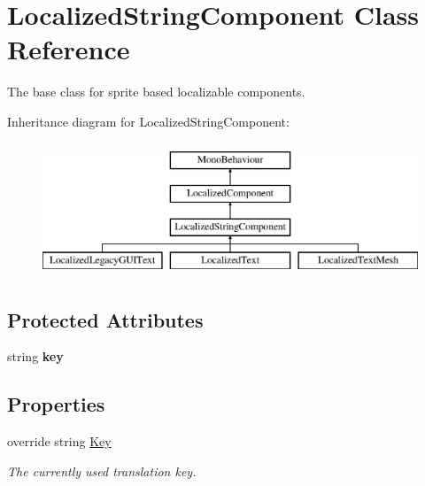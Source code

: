 \hypertarget{class_localized_string_component}{}\section{Localized\+String\+Component Class Reference}
\label{class_localized_string_component}


The base class for sprite based localizable components.  


Inheritance diagram for Localized\+String\+Component\+:\begin{figure}[H]
\begin{center}
\leavevmode
\includegraphics[height=4.000000cm]{class_localized_string_component}
\end{center}
\end{figure}
\subsection*{Protected Attributes}
\begin{DoxyCompactItemize}
\item 
string {\bfseries key}\hypertarget{class_localized_string_component_af2822eeef38a80844649833def4dab00}{}\label{class_localized_string_component_af2822eeef38a80844649833def4dab00}

\end{DoxyCompactItemize}
\subsection*{Properties}
\begin{DoxyCompactItemize}
\item 
override string \hyperlink{class_localized_string_component_a20a4bce753bc30c60383463a8556051c}{Key}
\begin{DoxyCompactList}\small\item\em The currently used translation key. \end{DoxyCompactList}\end{DoxyCompactItemize}
